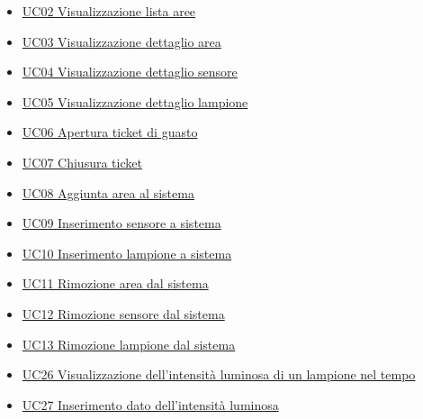 \begin{itemize}
    \item \hyperref[uc:02]{UC02 Visualizzazione lista aree}
    \item \hyperref[uc:03]{UC03 Visualizzazione dettaglio area}
    \item \hyperref[uc:04]{UC04 Visualizzazione dettaglio sensore}
    \item \hyperref[uc:05]{UC05 Visualizzazione dettaglio lampione}
    \item \hyperref[uc:06]{UC06 Apertura ticket di guasto}
    \item \hyperref[uc:07]{UC07 Chiusura ticket}
    \item \hyperref[uc:08]{UC08 Aggiunta area al sistema}
    \item \hyperref[uc:09]{UC09 Inserimento sensore a sistema}
    \item \hyperref[uc:10]{UC10 Inserimento lampione a sistema}
    \item \hyperref[uc:11]{UC11 Rimozione area dal sistema}
    \item \hyperref[uc:12]{UC12 Rimozione sensore dal sistema}
    \item \hyperref[uc:13]{UC13 Rimozione lampione dal sistema}
    \item \hyperref[uc:26]{UC26 Visualizzazione dell'intensità luminosa di un lampione nel tempo}
    \item \hyperref[uc:27]{UC27 Inserimento dato dell'intensità luminosa}
\end{itemize}